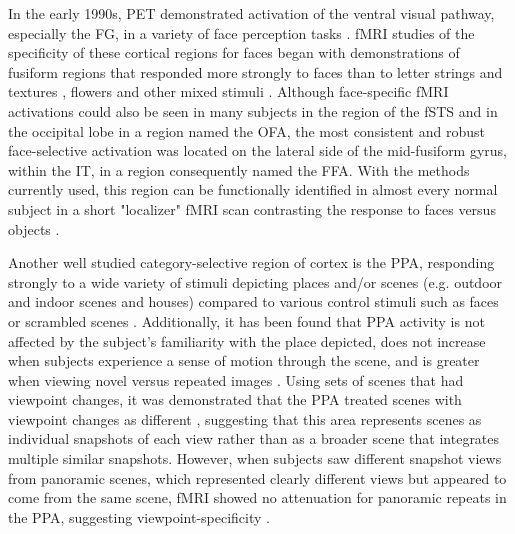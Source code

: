 In the early 1990s, \gls{PET} demonstrated activation of the ventral visual pathway, especially the \gls{FG}, in a variety of face perception tasks \cite{Haxby1991, Sergent1992}. \gls{fMRI} studies of the specificity of these cortical regions for faces began with demonstrations of fusiform regions that responded more strongly to faces than to letter strings and textures \cite{Puce1996}, flowers \cite{McCarthy1997} and other mixed stimuli  \cite{Kanwisher1997}. Although face-specific \gls{fMRI} activations could also be seen in many subjects in the region of the \gls{fSTS} and in the occipital lobe in a region named the \gls{OFA}, the most consistent and robust face-selective activation was located on the lateral side of the mid-fusiform gyrus, within the \gls{IT}, in a region consequently named the \gls{FFA}. With the methods currently used, this region can be functionally identified in almost every normal subject in a short "localizer" \gls{fMRI} scan contrasting the response to faces versus objects \cite{Kanwisher2006}.

Another well studied category-selective region of cortex is the \gls{PPA}, responding strongly to a wide variety of stimuli depicting places and/or scenes (e.g. outdoor and indoor scenes and houses) compared to various control stimuli such as faces or scrambled scenes \cite{Epstein1998}. Additionally, it has been found that \gls{PPA} activity is not affected by the subject's familiarity with the place depicted, does not increase when subjects experience a sense of motion through the scene, and is greater when viewing novel versus repeated images \cite{Epstein1999}. Using sets of scenes that had viewpoint changes, it was demonstrated that the \gls{PPA} treated scenes with viewpoint changes as different \cite{Epstein2003}, suggesting that this area represents scenes as individual snapshots of each view rather than as a broader scene that integrates multiple similar snapshots. However, when subjects saw different snapshot views from panoramic scenes, which represented clearly different views but appeared to come from the same scene, \gls{fMRI} showed no attenuation for panoramic repeats in the \gls{PPA}, suggesting viewpoint-specificity \cite{Park2009}.

